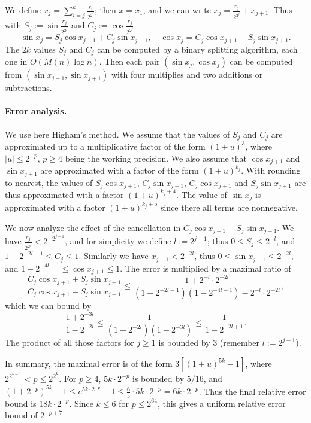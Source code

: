 \documentclass[12pt]{amsart}
\begin{document}
We define $x_j = \sum_{i=j}^{k} \frac{r_i}{2^{2^i}}$; then $x = x_1$,
and we can write $x_j = \frac{r_j}{2^{2^j}} + x_{j+1}$. Thus with
$S_j := \sin \frac{r_j}{2^{2^j}}$ and $C_j := \cos \frac{r_j}{2^{2^j}}$:
\[ \sin x_j = S_j \cos x_{j+1} + C_j \sin x_{j+1}, \quad
   \cos x_j = C_j \cos x_{j+1} - S_j \sin x_{j+1}. \]
The $2k$ values $S_j$ and $C_j$ can be computed by a binary splitting
algorithm, each one in $O(M(n) \log n)$.
Then each pair $(\sin x_j, \cos x_j)$ can be computed from
$(\sin x_{j+1}, \sin x_{j+1})$ with four multiplies and two additions or
subtractions.

\paragraph{Error analysis.}
We use here Higham's method. We assume that the values of $S_j$
and $C_j$ are approximated up to a multiplicative factor of the form
$(1+u)^3$, where $|u| \leq 2^{-p}$, $p \geq 4$ being the working precision.
We also assume that $\cos x_{j+1}$ and $\sin x_{j+1}$ are
approximated with a factor of the form $(1+u)^{k_j}$.
With rounding to nearest, the values of $S_j \cos x_{j+1}$,
$C_j \sin x_{j+1}$, $C_j \cos x_{j+1}$ and $S_j \sin x_{j+1}$ are thus
approximated with a factor $(1+u)^{k_j+4}$.
The value of $\sin x_j$ is approximated with a factor $(1+u)^{k_j+5}$ since
there all terms are nonnegative.

We now analyze the effect of the cancellation in
$C_j \cos x_{j+1} - S_j \sin x_{j+1}$.
We have $\frac{r_j}{2^{2^j}} < 2^{-2^{j-1}}$, and for simplicity we define
$l := 2^{j-1}$;
thus $0 \leq S_j \leq 2^{-l}$, and $1-2^{-2l-1} \leq C_j \leq 1$.
Similarly we have $x_{j+1} < 2^{-2l}$, thus
$0 \leq \sin x_{j+1} \leq 2^{-2l}$, and $1-2^{-4l-1} \leq \cos x_{j+1} \leq 1$.
The error is multiplied by a maximal ratio of
\[ \frac{C_j \cos x_{j+1} + S_j \sin x_{j+1}}
{C_j \cos x_{j+1} - S_j \sin x_{j+1}} \leq
\frac{1+2^{-l} \cdot 2^{-2l}}{(1-2^{-2l-1})(1-2^{-4l-1})-2^{-l} \cdot 2^{-2l}},
\]
which we can bound by
\[ \frac{1+2^{-3l}}{1-2^{-2l}} \leq \frac{1}{(1-2^{-2l})(1-2^{-3l})}
\leq \frac{1}{1-2^{-2l+1}}. \]
The product of all those factors for $j \geq 1$ is bounded by $3$
(remember $l := 2^{j-1}$).

In summary, the maximal error is of the form $3 [(1+u)^{5k}-1]$, where
$2^{2^{k-1}} < p \leq 2^{2^k}$.
For $p \geq 4$, $5k \cdot 2^{-p}$ is bounded by $5/16$, and
$(1+2^{-p})^{5k} - 1 \leq e^{5k \cdot 2^{-p}} - 1 \leq \frac{6}{5}
\cdot 5k \cdot 2^{-p} = 6k \cdot 2^{-p}$.
Thus the final relative error bound is $18k \cdot 2^{-p}$.
Since $k \leq 6$ for $p \leq 2^{64}$, this gives a uniform relative error
bound of $2^{-p+7}$.
\end{document}
